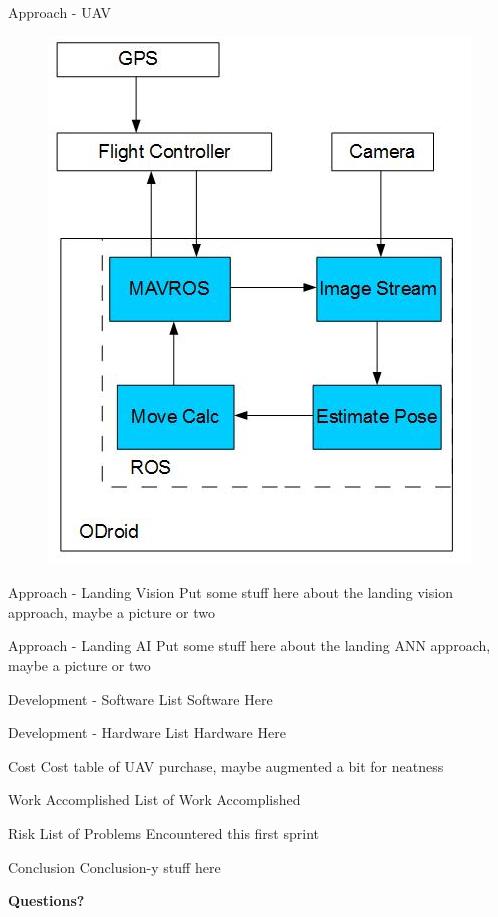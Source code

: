 \documentclass[11pt]{beamer}
\begin{document}
\begin{frame}{Approach - UAV}
\begin{figure}
\includegraphics[width=.5\textwidth]{broad_approach1}
\end{figure}
\end{frame}

\begin{frame}{Approach - Landing Vision}
Put some stuff here about the landing vision approach, maybe a picture or two
\end{frame}

\begin{frame}{Approach - Landing AI}
Put some stuff here about the landing ANN approach, maybe a picture or two
\end{frame}


\begin{frame}{Development - Software}
List Software Here
\end{frame}

\begin{frame}{Development - Hardware}
List Hardware Here
\end{frame}

\begin{frame}{Cost}
Cost table of UAV purchase, maybe augmented a bit for neatness
\end{frame}

\begin{frame}{Work Accomplished}
List of Work Accomplished
\end{frame}

\begin{frame}{Risk}
List of Problems Encountered this first sprint
\end{frame}

\begin{frame}{Conclusion}
Conclusion-y stuff here
\end{frame}

\begin{frame}
\textbf{Questions?}
\end{frame}
\end{document}

